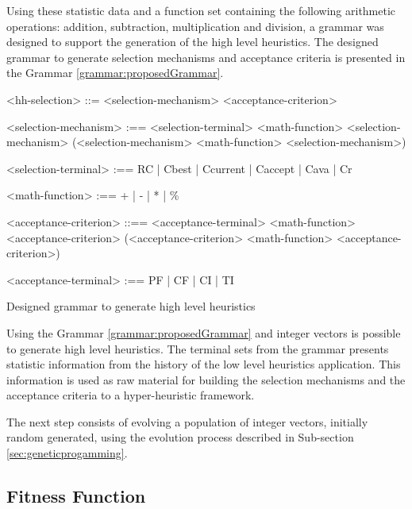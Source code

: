 \documentclass[conference]{IEEEtran}
\begin{document}
 Using these statistic data and a function set containing the following arithmetic operations: addition, subtraction, multiplication and division, a grammar was designed to support the generation of the high level heuristics. The designed grammar to generate selection mechanisms and acceptance criteria is presented in the Grammar \ref{grammar:proposedGrammar}.
 
 \begin{Grammar}
 	\begin{grammar}
 		<hh-selection> ::= <selection-mechanism> <acceptance-criterion> 
 		
 		<selection-mechanism> :==  <selection-terminal>   
 		\alt <selection-mechanism> <math-function> <selection-mechanism> 
 		\alt (<selection-mechanism> <math-function> <selection-mechanism>) 
 		
 		<selection-terminal> :== 
 		RC 
 		| Cbest 
 		| Ccurrent 
 		| Caccept 
 		| Cava 
 		| Cr
 		
 		<math-function> :== + 
 		| - 
 		| * 
 		| \%
 		
 		<acceptance-criterion> ::== <acceptance-terminal> 
 		\alt <acceptance-criterion> <math-function>
 		<acceptance-criterion>
 		\alt (<acceptance-criterion>  <math-function> <acceptance-criterion>) 
 		
 		<acceptance-terminal> :== PF | CF | CI | TI
 		
 		
 		
 	\end{grammar}
 	\caption{Designed grammar to generate high level heuristics}
 	\label{grammar:proposedGrammar}
 \end{Grammar}

Using the Grammar \ref{grammar:proposedGrammar} and integer vectors is possible to generate high level heuristics. The terminal sets from the grammar presents statistic information from the history of  the low level heuristics application. This information is used as raw material for building the selection mechanisms and the acceptance criteria to a hyper-heuristic framework.

The next step consists of evolving a population of integer vectors, initially random generated, using the evolution process described in Sub-section \ref{sec:geneticprogamming}. 
\subsection{Fitness Function}
\label{subsection:fitnessFunction}
\end{document}
